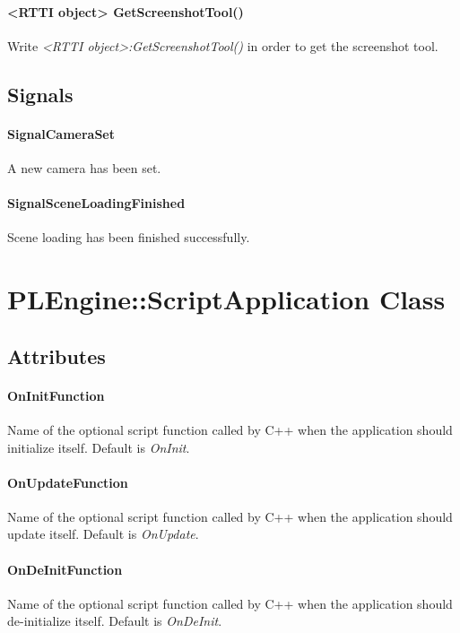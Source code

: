 \paragraph{<RTTI object> GetScreenshotTool()}
Write \emph{<RTTI object>:GetScreenshotTool()} in order to get the screenshot tool.


\subsection{Signals}

\paragraph{SignalCameraSet}
A new camera has been set.

\paragraph{SignalSceneLoadingFinished}
Scene loading has been finished successfully.




\section{PLEngine::ScriptApplication Class}


\subsection{Attributes}

\paragraph{OnInitFunction}
Name of the optional script function called by C++ when the application should initialize itself. Default is \emph{OnInit}.

\paragraph{OnUpdateFunction}
Name of the optional script function called by C++ when the application should update itself. Default is \emph{OnUpdate}.

\paragraph{OnDeInitFunction}
Name of the optional script function called by C++ when the application should de-initialize itself. Default is \emph{OnDeInit}.


